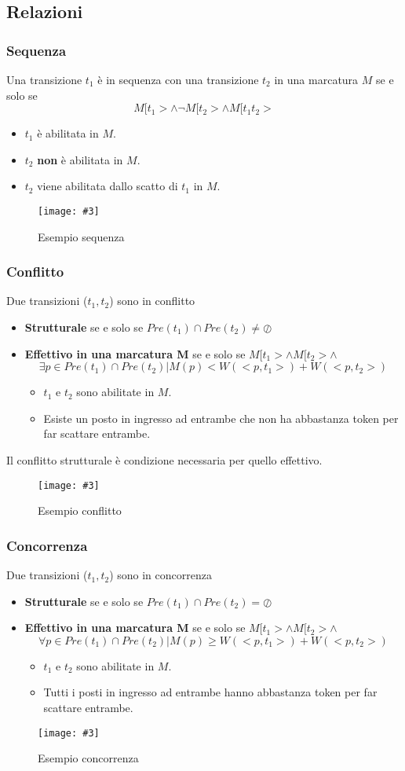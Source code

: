 \documentclass[12pt, twoside, letterpaper]{article}
\newcommand{\img}[3] {
	\begin{figure}[h]
		\caption{#1}
		\centering
		\texttt{[image: \#3]}\\
	\end{figure}
}
\begin{document}
		\subsection{Relazioni}
			\subsubsection{Sequenza}
				Una transizione $t_1$ è in sequenza con una transizione $t_2$ in una marcatura $M$ se e solo se $$M [t_1 > \land \neg M[t_2 > \land M[t_1 t_2 >$$
				\begin{itemize}
					\item $t_1$ è abilitata in $M$.
					\item $t_2$ \textbf{non} è abilitata in $M$.
					\item $t_2$ viene abilitata dallo scatto di $t_1$ in $M$.
				\end{itemize}
				\img{Esempio sequenza}{0.45}{img/es_sequenza.png}

			\subsubsection{Conflitto}
				Due transizioni ($t_1,t_2$) sono in conflitto 
				\begin{itemize}
					\item \textbf{Strutturale} se e solo se $Pre(t_1) \cap Pre(t_2) \neq  \oslash$
					\item \textbf{Effettivo in una marcatura M} se e solo se $M[t_1> \land M[t_2> \land$ $$\exists p \in Pre(t_1) \cap Pre(t_2) | M(p) < W(<p,t_1>) + W(<p,t_2>)$$
					\begin{itemize}
						\item $t_1$ e $t_2$ sono abilitate in $M$.
						\item Esiste un posto in ingresso ad entrambe che non ha abbastanza token per far scattare entrambe.
					\end{itemize}
				\end{itemize}
				Il conflitto strutturale è condizione necessaria per quello effettivo.
				\img{Esempio conflitto}{0.45}{img/es_conflitto.png}
			
			\subsubsection{Concorrenza}
				Due transizioni ($t_1,t_2$) sono in concorrenza
				\begin{itemize}
					\item \textbf{Strutturale} se e solo se $Pre(t_1) \cap Pre(t_2) = \oslash$
					\item \textbf{Effettivo in una marcatura M} se e solo se $M[t_1> \land M[t_2> \land$ $$\forall p \in Pre(t_1) \cap Pre(t_2) | M(p) \geq W(<p,t_1>) + W(<p,t_2>)$$
					\begin{itemize}
						\item $t_1$ e $t_2$ sono abilitate in $M$.
						\item Tutti i posti in ingresso ad entrambe hanno abbastanza token per far scattare entrambe.
					\end{itemize}
				\end{itemize}
				\img{Esempio concorrenza}{0.45}{img/es_concorrenza.png}
		
\end{document}
